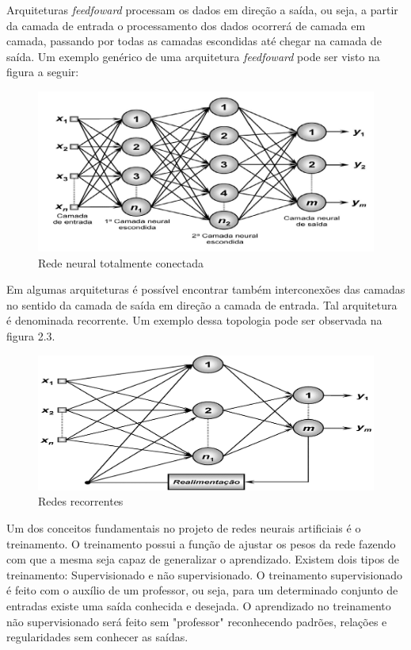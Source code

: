 Arquiteturas \textit{feedfoward} processam os dados em direção a saída, ou seja, a partir da camada de entrada o processamento dos dados ocorrerá de camada em camada, passando por todas as camadas escondidas até chegar na camada de saída. Um exemplo genérico de uma arquitetura \textit{feedfoward} pode ser visto na figura a seguir:
\begin{figure}[H]
	\centering
    \label{fig2}
    \vspace{3ex}%
	\includegraphics[scale=0.4]{pasta1_figuras/rna-Feedfoward.png}
    \caption{Rede neural totalmente conectada}
\end{figure}

Em algumas arquiteturas é possível encontrar também interconexões das camadas no sentido da camada de saída em direção a camada de entrada. Tal arquitetura é denominada recorrente. Um exemplo dessa topologia pode ser observada na figura 2.3.
\begin{figure}[H]
	\centering
    \label{fig3}
    \vspace{3ex}%
	\includegraphics[scale=0.35]{pasta1_figuras/redes-recorrentes.png}
    \caption{Redes recorrentes}
\end{figure}

Um dos conceitos fundamentais no projeto de redes neurais artificiais é o treinamento. O treinamento possui a função de ajustar os pesos da rede fazendo com que a mesma seja capaz de generalizar o aprendizado. Existem dois tipos de treinamento: Supervisionado e não supervisionado. O treinamento supervisionado é feito com o auxílio de um professor, ou seja, para um determinado conjunto de entradas existe uma saída conhecida e desejada. O aprendizado no treinamento não supervisionado será feito sem "professor" reconhecendo padrões, relações e regularidades sem conhecer as saídas.

